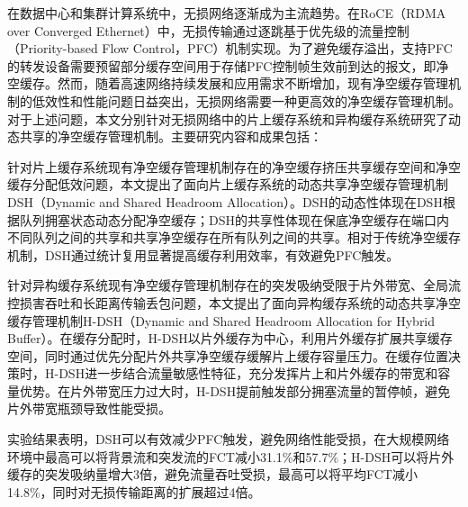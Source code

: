 
\begin{chineseabstract}
    在数据中心和集群计算系统中，无损网络逐渐成为主流趋势。在RoCE（RDMA over Converged Ethernet）中，无损传输通过逐跳基于优先级的流量控制（Priority-based Flow Control，PFC）机制实现。为了避免缓存溢出，支持PFC的转发设备需要预留部分缓存空间用于存储PFC控制帧生效前到达的报文，即净空缓存。然而，随着高速网络持续发展和应用需求不断增加，现有净空缓存管理机制的低效性和性能问题日益突出，无损网络需要一种更高效的净空缓存管理机制。对于上述问题，本文分别针对无损网络中的片上缓存系统和异构缓存系统研究了动态共享的净空缓存管理机制。主要研究内容和成果包括：

    针对片上缓存系统现有净空缓存管理机制存在的净空缓存挤压共享缓存空间和净空缓存分配低效问题，本文提出了面向片上缓存系统的动态共享净空缓存管理机制DSH（Dynamic and Shared Headroom Allocation）。DSH的动态性体现在DSH根据队列拥塞状态动态分配净空缓存；DSH的共享性体现在保底净空缓存在端口内不同队列之间的共享和共享净空缓存在所有队列之间的共享。相对于传统净空缓存机制，DSH通过统计复用显著提高缓存利用效率，有效避免PFC触发。
    
    针对异构缓存系统现有净空缓存管理机制存在的突发吸纳受限于片外带宽、全局流控损害吞吐和长距离传输丢包问题，本文提出了面向异构缓存系统的动态共享净空缓存管理机制H-DSH（Dynamic and Shared Headroom Allocation for Hybrid Buffer）。在缓存分配时，H-DSH以片外缓存为中心，利用片外缓存扩展共享缓存空间，同时通过优先分配片外共享净空缓存缓解片上缓存容量压力。在缓存位置决策时，H-DSH进一步结合流量敏感性特征，充分发挥片上和片外缓存的带宽和容量优势。在片外带宽压力过大时，H-DSH提前触发部分拥塞流量的暂停帧，避免片外带宽瓶颈导致性能受损。
    
    实验结果表明，DSH可以有效减少PFC触发，避免网络性能受损，在大规模网络环境中最高可以将背景流和突发流的FCT减小31.1\%和57.7\%；H-DSH可以将片外缓存的突发吸纳量增大3倍，避免流量吞吐受损，最高可以将平均FCT减小14.8\%，同时对无损传输距离的扩展超过4倍。
    

\end{chineseabstract}

